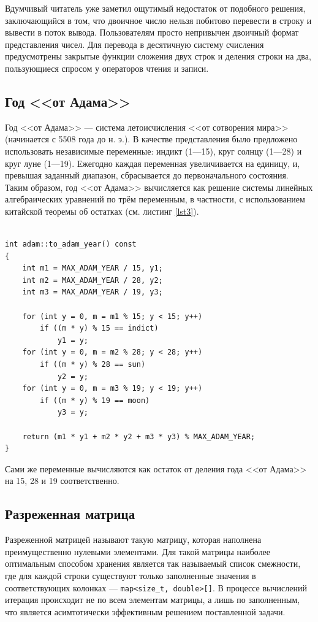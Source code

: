 \documentclass[a4paper,12pt]{article}
\begin{document}
Вдумчивый читатель уже заметил ощутимый недостаток от подобного решения, заключающийся в том, что двоичное число нельзя побитово перевести в строку и вывести в поток вывода.
Пользователям просто непривычен двоичный формат представления чисел.
Для перевода в десятичную систему счисления предусмотрены закрытые функции сложения двух строк и деления строки на два, пользующиеся спросом у операторов чтения и записи.

\subsection{Год <<от Адама>>}

Год <<от Адама>> — система летоисчисления <<от сотворения мира>> (начинается с 5508 года до н. э.).
В качестве представления было предложено использовать независимые переменные: индикт (1—15), круг солнцу (1—28) и круг луне (1—19).
Ежегодно каждая переменная увеличивается на единицу, и, превышая заданный диапазон, сбрасывается до первоначального состояния.\\

Таким образом, год <<от Адама>> вычисляется как решение системы линейных алгебраических уравнений по трём переменным, в частности, с использованием китайской теоремы об остатках (см. листинг \ref{lst3}).

\begin{lstlisting}[caption={Алгоритм нахождения года <<от Адама>>},captionpos=b,label=lst3]
	
int adam::to_adam_year() const
{
	int m1 = MAX_ADAM_YEAR / 15, y1;
	int m2 = MAX_ADAM_YEAR / 28, y2;
	int m3 = MAX_ADAM_YEAR / 19, y3;
	
	for (int y = 0, m = m1 % 15; y < 15; y++)
		if ((m * y) % 15 == indict)
			y1 = y;
	for (int y = 0, m = m2 % 28; y < 28; y++)
		if ((m * y) % 28 == sun)
			y2 = y;
	for (int y = 0, m = m3 % 19; y < 19; y++)
		if ((m * y) % 19 == moon)
			y3 = y;
	
	return (m1 * y1 + m2 * y2 + m3 * y3) % MAX_ADAM_YEAR;
}

\end{lstlisting}

Сами же переменные вычисляются как остаток от деления года <<от Адама>> на 15, 28 и 19 соответственно.

\subsection{Разреженная матрица}

Разреженной матрицей называют такую матрицу, которая наполнена преимущественно нулевыми элементами.
Для такой матрицы наиболее оптимальным способом хранения является так называемый список смежности, где для каждой строки существуют только заполненные значения в соответствующих колонках — \verb!map<size_t, double>[]!.
В процессе вычислений итерация происходит не по всем элементам матрицы, а лишь по заполненным, что является асимтотически эффективным решением поставленной задачи.\\
\end{document}
